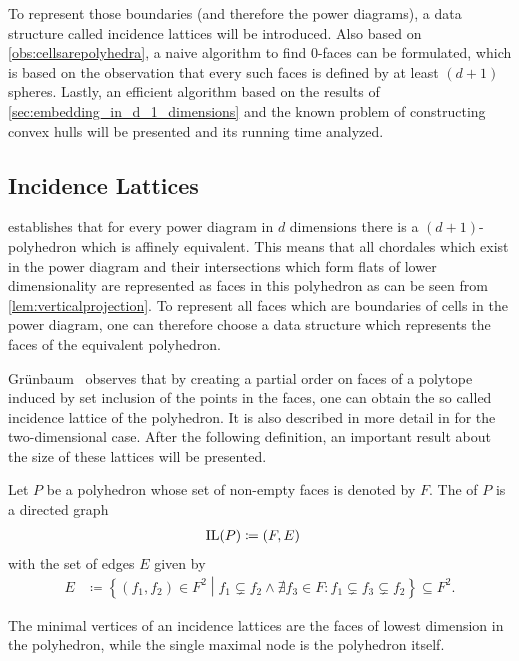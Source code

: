 To represent those boundaries (and therefore the power diagrams), a data structure called incidence lattices will be introduced.
Also based on \cref{obs:cellsarepolyhedra}, a naive algorithm to find $0$-faces can be formulated, which is based on the observation that every such faces is defined by at least $(d+1)$ spheres.
Lastly, an efficient algorithm based on the results of \cref{sec:embedding_in_d_1_dimensions} and the known problem of constructing convex hulls will be presented and its running time analyzed.

\subsection{Incidence Lattices}
\label{sub:incidence_lattices}
 establishes that for every power diagram in $d$ dimensions there is a $(d+1)$-polyhedron which is affinely equivalent.
This means that all chordales which exist in the power diagram and their intersections which form flats of lower dimensionality are represented as faces in this polyhedron as can be seen from \cref{lem:verticalprojection}.
To represent all faces which are boundaries of cells in the power diagram, one can therefore choose a data structure which represents the faces of the equivalent polyhedron.

Grünbaum~\cite{grunbaum2003convex} observes that by creating a partial order on faces of a polytope induced by set inclusion of the points in the faces, one can obtain the so called incidence lattice of the polyhedron.
It is also described in more detail in \cite{edelsbrunner1986constructing} for the two-dimensional case.
After the following definition, an important result about the size of these lattices will be presented.

\begin{definition}
    \label{def:incidencelattice}
    Let $P$ be a polyhedron whose set of non-empty faces is denoted by $F$.
    The  of $P$ is a directed graph
    \begin{align}
        \operatorname{IL}(P) &\coloneqq (F, E)
    \end{align}
    with the set of edges $E$ given by
    \begin{align}
        E &\coloneqq \left\{ (f_1, f_2) \in F^2 \middle| f_1 \subsetneq f_2 \wedge \nexists f_3 \in F : f_1 \subsetneq f_3 \subsetneq f_2 \right\} \subseteq F^2.
    \end{align}
\end{definition}
The minimal vertices of an incidence lattices are the faces of lowest dimension in the polyhedron, while the single maximal node is the polyhedron itself.

